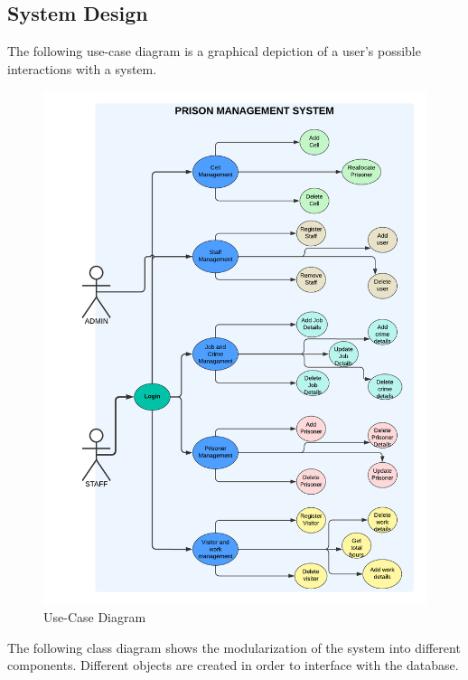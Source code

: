 \subsection{System Design}
    The following use-case diagram is a graphical depiction of a user's possible interactions with a system. 
    \begin{figure}[H]
        \centering
        \includegraphics[width=\textwidth]{figures/use-case.png}
        \caption{Use-Case Diagram}
        \label{fig:usecase}
    \end{figure}
    \newpage
    The following class diagram shows the modularization of the system into different components. Different objects are created in order to interface with the database.
